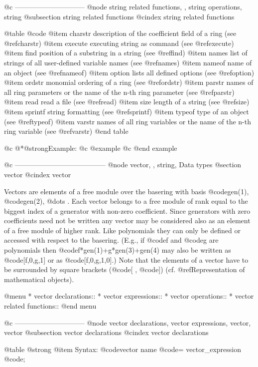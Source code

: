 {{{{{{@c ------------------------------
@node string related functions,  , string operations, string
@subsection string related functions
@cindex string related functions

@table @code
@item charstr
description of the coefficient field of a ring (see @ref{charstr})
@item execute
executing string as command (see @ref{execute})
@item find
position of a substring in a string (see @ref{find})
@item names
list of strings of all user-defined variable names (see @ref{names})
@item nameof
name of an object (see @ref{nameof})
@item option
lists all defined options (see @ref{option})
@item ordstr
monomial ordering of a ring (see @ref{ordstr})
@item parstr
names of all ring parameters or the
name of the n-th ring parameter (see @ref{parstr})
@item read
read a file (see @ref{read})
@item size
length of a string (see @ref{size})
@item sprintf
string formatting (see @ref{sprintf})
@item typeof
type of an object (see @ref{typeof})
@item varstr
names of all ring variables or the
name of the n-th ring variable (see @ref{varstr})
@end table

@c @*@strong{Example:}
@c @example
@c @end example

@c ---------------------------------------
@node vector,  , string, Data types
@section vector
@cindex vector

Vectors are elements of a free module over the basering with basis
@code{gen(1)}, @code{gen(2)}, @dots{} .
Each vector belongs to a free module of rank equal to the biggest index
of a generator with non-zero coefficient. Since generators with zero
coefficients need not be written any vector may be considered
also as an element of a free module of higher rank.
Like polynomials they
can only be defined or accessed with respect to the basering.
(E.g., if @code{f} and @code{g} are polynomials then
@code{f*gen(1)+g*gen(3)+gen(4)} may also be written as @code{[f,0,g,1]}
or as @code{[f,0,g,1,0]}.) Note that the elements of a vector have to be
surrounded by square brackets (@code{[}  , @code{]})
(cf. @ref{Representation of mathematical objects}).

@menu
* vector declarations::
* vector expressions::
* vector operations::
* vector related functions::
@end menu

@c ------------------------------
@node vector declarations, vector expressions, vector, vector
@subsection vector declarations
@cindex vector declarations

@table @strong
@item Syntax:
@code{vector} name @code{=} vector_expression @code{;}

}}}}}}
